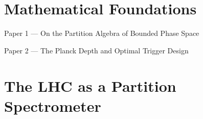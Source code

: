 \documentclass[12pt,a4paper,openany]{book}
\begin{document}
\part{Mathematical Foundations}
\label{part:foundations}

{}%
  {Paper 1 — On the Partition Algebra of Bounded Phase Space}



{}%
  {Paper 2 — The Planck Depth and Optimal Trigger Design}



\part{The LHC as a Partition Spectrometer}
\label{part:spectrometer}




\end{document}
